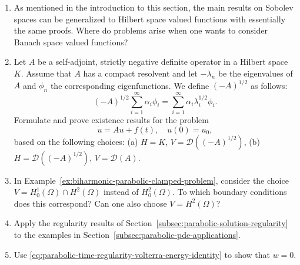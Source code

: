 \begin{enumerate}[label=\thesection.\arabic*.,ref=\thesection.\arabic*,start=1,series=book-problems]

\item\label{ex:banach-valued-sobolev-generalization-obstructions} As mentioned in the introduction to this section, the main results on Sobolev spaces can be generalized to Hilbert space valued functions with essentially the same proofs. Where do problems arise when one wants to consider Banach space valued functions?

\item\label{ex:spectral-square-root-parabolic-space-choices} Let $A$ be a self-adjoint, strictly negative definite operator in a Hilbert space $K$. Assume that $A$ has a compact resolvent and let $-\lambda_n$ be the eigenvalues of $A$ and $\phi_n$ the corresponding eigenfunctions. We define $(-A)^{1/2}$ as follows:
\begin{equation}\label{eq:negative-self-adjoint-operator-spectral-square-root}
(-A)^{1/2}\sum_{i=1}^\infty\alpha_i\phi_i=\sum_{i=1}^\infty\alpha_i\lambda_i^{1/2}\phi_i.
\end{equation}
Formulate and prove existence results for the problem\[\dot u=Au+f(t),\quad u(0)=u_0,\]based on the following choices: (a) $H=K$, $V=\mathcal{D}((-A)^{1/2})$, (b) $H=\mathcal{D}((-A)^{1/2})$, $V=\mathcal{D}(A)$.

\item\label{ex:biharmonic-parabolic-alternative-boundary-spaces} In Example~\ref{ex:biharmonic-parabolic-clamped-problem}, consider the choice $V=H_0^1(\Omega)\cap H^2(\Omega)$ instead of $H_0^2(\Omega)$. To which boundary conditions does this correspond? Can one also choose $V=H^2(\Omega)$?

\item\label{ex:parabolic-regularity-applications} Apply the regularity results of Section~\ref{subsec:parabolic-solution-regularity} to the examples in Section~\ref{subsec:parabolic-pde-applications}.

\item\label{ex:parabolic-volterra-energy-zero-solution} Use \eqref{eq:parabolic-time-regularity-volterra-energy-identity} to show that $w=0$.

\end{enumerate}
